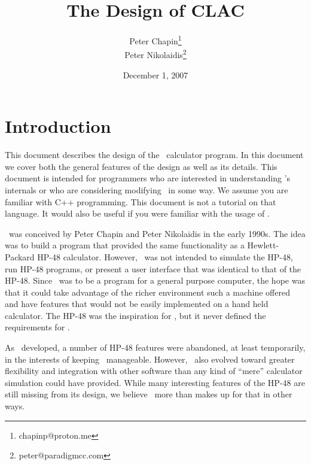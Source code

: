 \documentclass{report}
\begin{document}
\title{The Design of CLAC}
\author{Peter Chapin\thanks{chapinp@proton.me}\\
        Peter Nikolaidis\thanks{peter@paradigmcc.com}}
\date{December 1, 2007}
\maketitle

\tableofcontents
\newpage
{}

\chapter{Introduction}

This document describes the design of the \CLAC\ calculator program. In this document we cover
both the general features of the design as well as its details. This document is intended for
programmers who are interested in understanding \CLAC's internals or who are considering
modifying \CLAC\ in some way. We assume you are familiar with C++ programming. This document is
not a tutorial on that language. It would also be useful if you were familiar with the usage of
\CLAC.

\CLAC\ was conceived by Peter Chapin and Peter Nikolaidis in the early 1990s. The idea was to
build a program that provided the same functionality as a Hewlett-Packard HP-48 calculator.
However, \CLAC\ was not intended to simulate the HP-48, run HP-48 programs, or present a user
interface that was identical to that of the HP-48. Since \CLAC\ was to be a program for a
general purpose computer, the hope was that it could take advantage of the richer environment
such a machine offered and have features that would not be easily implemented on a hand held
calculator. The HP-48 was the inspiration for \CLAC, but it never defined the requirements for
\CLAC.

As \CLAC\ developed, a number of HP-48 features were abandoned, at least temporarily, in the
interests of keeping \CLAC\ manageable. However, \CLAC\ also evolved toward greater flexibility
and integration with other software than any kind of ``mere'' calculator simulation could have
provided. While many interesting features of the HP-48 are still missing from its design, we
believe \CLAC\ more than makes up for that in other ways.
\end{document}
